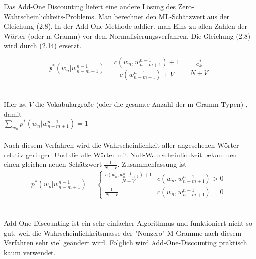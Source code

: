 Das Add-One Discounting liefert eine andere L\"osung des Zero-Wahrscheinlichkeits-Problems. Man berechnet den ML-Sch\"atzwert aus der Gleichung (2.8). In der Add-One-Methode addiert man Eins zu allen Zahlen der W\"orter (oder m-Gramm) vor dem Normalisierungsverfahren.  Die Gleichung (2.8) wird durch (2.14) ersetzt.

\begin{equation}
\label{equation:add_one_01}
p^{*}(w_{n}|w_{n-m+1}^{n-1})=\frac{c(w_{n},w_{n-m+1}^{n-1})+1}{c(w_{n-m+1}^{n-1})+V}=\frac{c_{k}^{*}}{N+V}
\end{equation}
\\
\\
Hier ist $V$ die Vokabulargr\"o\ss e (oder die gesamte Anzahl der m-Gramm-Typen) , damit \\ 
$\sum_{w_{n}}p^{*}(w_{n}|w_{n-m+1}^{n-1})=1$
\\
\\
Nach diesem Verfahren wird die Wahrscheinlichkeit aller angesehenen W\"orter relativ geringer. Und die alle W\"orter mit Null-Wahrscheinlichkeit bekommen einen gleichen neuen Sch\"atzwert $\frac{1}{N+V}$. Zusammenfassung ist
\begin{equation}
p^{*}(w_{n}|w_{n-m+1}^{n-1})=\begin{cases}
\frac{c(w_{n},w_{n-m+1}^{n-1})+1}{N+V} & c(w_{n},w_{n-m+1}^{n-1})>0 \\
\frac{1}{N+V} & c(w_{n},w_{n-m+1}^{n-1})=0 
\end{cases}
\end{equation}
\\
\\
Add-One-Discounting ist ein sehr einfacher Algorithmus und funktioniert nicht so gut, weil die Wahrscheinlichkeitsmasse der "Nonzero"-M-Gramme nach diesem Verfahren sehr viel ge\"andert wird\cite{book_speech}. Folglich wird Add-One-Discounting  praktisch kaum verwendet.